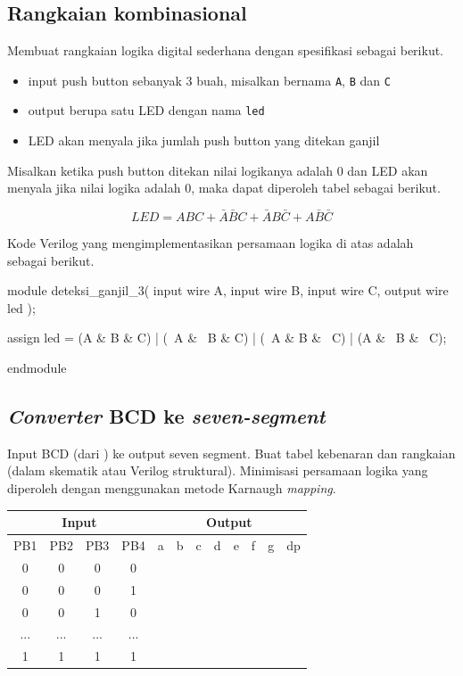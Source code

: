 \documentclass[a4paper,12pt,bahasa]{extarticle}
\begin{document}
\subsection{Rangkaian kombinasional}

Membuat rangkaian logika digital sederhana dengan spesifikasi sebagai berikut.

\begin{itemize}
\item input push button sebanyak 3 buah, misalkan bernama {\tt A}, {\tt B}
dan {\tt C}
\item output berupa satu LED dengan nama {\tt led}
\item LED akan menyala jika jumlah push button
yang ditekan ganjil
\end{itemize}

Misalkan ketika push button ditekan nilai logikanya adalah 0 dan 
LED akan menyala jika nilai logika adalah 0, maka dapat diperoleh tabel
sebagai berikut.



\begin{equation*}
LED = ABC + \bar{A}\bar{B}C + \bar{A}B\bar{C} + A\bar{B}\bar{C}
\end{equation*}

Kode Verilog yang mengimplementasikan persamaan logika di atas adalah
sebagai berikut.
\begin{verilogcode}
module deteksi_ganjil_3(
  input wire A,
  input wire B,
  input wire C,
  output wire led );

  assign led = (A & B & C) | (~A & ~B & C) | (~A & B & ~C) | (A & ~B & ~C);

endmodule
\end{verilogcode}


\subsection{\textit{Converter} BCD ke \textit{seven-segment}}

Input BCD (dari ) ke output seven segment. Buat tabel kebenaran dan rangkaian (dalam skematik
atau Verilog struktural). Minimisasi persamaan logika yang diperoleh dengan menggunakan
metode Karnaugh \textit{mapping}.

{\centering
\begin{tabular}{|c|c|c|c||c|c|c|c|c|c|c|c|}
\hline
\multicolumn{4}{|c||}{Input} & \multicolumn{8}{|c|}{Output} \\
\hline
PB1 & PB2 & PB3 & PB4 & a & b & c & d & e & f & g & dp \\
\hline
0 & 0 & 0 & 0 &  &  &  &  &  &  &  & \\
0 & 0 & 0 & 1 &  &  &  &  &  &  &  & \\
0 & 0 & 1 & 0 &  &  &  &  &  &  &  & \\
... & ... & ... & ... &  &  &  &  &  &  &  & \\
1 & 1 & 1 & 1 &  &  &  &  &  &  &  & \\
\hline
\end{tabular}
\par}
\end{document}
